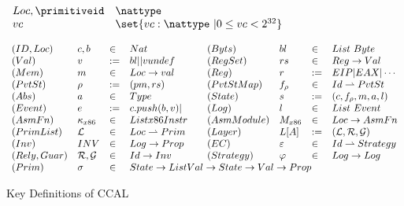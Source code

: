\newcommand{\valueundef}{\mathrm{\textsf{vundef}}}
\begin{figure}

$
\begin{array}{llll}
Loc, \primitiveid &\nattype \\
vc & \set{vc : \nattype ~\vert 0 \leq vc < 2^{32}} \\

\end{array}
$

$
\begin{array}{lllllllll}

(ID, Loc) & c, b & \in & Nat &                                                                & (Byts) & bl & \in & List \ Byte \\
(Val)& v &:= & bl\vert  \vert vundef   &                                              & (RegSet) & rs & \in & Reg \rightarrow Val \\                          
(Mem) & m & \in & Loc \rightarrow val &                                      & (Reg) & r & := & EIP\vert EAX \vert \cdots \\                          
(PvtSt) & \rho & := & (pm, rs) &                                                            & (PvtStMap) & f_{\rho} & \in & Id \rightharpoonup  PvtSt \\
(Abs) & a & \in & Type  &                                                                       & (State) & s & := & (c, f_\rho, m, a, l) \\
(Event) & e & := & c.push(b, v) \vert &                                                 & (Log) & l & \in & List \ Event \\
(AsmFn) & \kappa_{x86} & \in & List x86Instr &                                  & (AsmModule) & M_{x86} & \in & Loc \rightarrow AsmFn \\
(PrimList) & \mathcal{L} & \in & Loc \rightharpoonup Prim &             & (Layer) & L[A] & :=& ( \mathcal{L} , \mathcal{R}, \mathcal{G}) \\
(Inv) & INV & \in & Log \rightarrow Prop  &                                           & (EC)  & \varepsilon  & \in & Id \rightharpoonup Strategy \\
(Rely, Guar) & \mathcal{R}, \mathcal{G} & \in & Id \rightarrow Inv &  & (Strategy) & \varphi & \in & Log \rightarrow Log           \\   
  (Prim) & \sigma & \in & \multicolumn{6}{l}{State \rightarrow List Val \rightarrow  State \rightarrow  Val \rightarrow Prop} \\
\end{array}
$





\caption{Key Definitions of CCAL}
\label{fig:key-definitions-of-ccal}
\end{figure}

